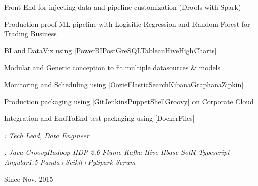 \begin{cventries}
{\begin{cvsubentries}
{\begin{cvitems}
	\item {Front-End for injecting data and pipeline customization (Drools with Spark) }
	\item {Production proof ML pipeline with Logisitic Regression and Random Forest for Trading Business}
	\item {BI and DataViz using [PowerBI{\enskip\cdotp\enskip}PostGreSQL{\enskip\cdotp\enskip}Tableau{\enskip\cdotp\enskip}Hive{\enskip\cdotp\enskip}HighCharts]}
	\item {Modular and Generic conception to fit multiple datasources \& models}
	\item {Monitoring and Scheduling using [\scriptsize Oozie{\enskip\cdotp\enskip}ElasticSearch{\enskip\cdotp\enskip}Kibana{\enskip\cdotp\enskip}Graphana{\enskip\cdotp\enskip}Zipkin]}
	\item {Production packaging using [Git{\enskip\cdotp\enskip}Jenkins{\enskip\cdotp\enskip}Puppet{\enskip\cdotp\enskip}Shell{\enskip\cdotp\enskip}Groovy] on Corporate Cloud}
	\item {Integration and EndToEnd test packaging using [DockerFiles]}
\end{cvitems}
\begin{cvitemsnobullet}
 \setlength\itemsep{0.3em}
\item {\textit{\scriptsize \color{awesome-sub}{Roles}\color{text}: Tech Lead, Data Engineer}}
\item {\textit{\scriptsize {}\color{text}: Java{\enskip\cdotp\enskip}
Groovy{\enskip\cdotp\enskip}Hadoop HDP 2.6{\enskip\cdotp\enskip}
Flume{\enskip\cdotp\enskip}
Kafka{\enskip\cdotp\enskip}
Hive{\enskip\cdotp\enskip}
Hbase{\enskip\cdotp\enskip}
SolR{\enskip\cdotp\enskip}
Typescript{\enskip\cdotp\enskip}
Angular1.5{\enskip\cdotp\enskip}
Panda+Scikit+PySpark{\enskip\cdotp\enskip}
Scrum}
}
\end{cvitemsnobullet}
}{Since Nov. 2015}{}
\end{cvsubentries}
}



\end{cventries}

